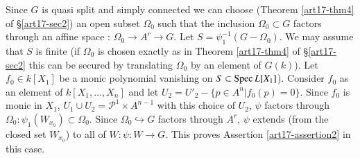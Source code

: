 \begin{romancase}%
Since $G$ is quasi split and simply connected we can choose (Theorem \ref{art17-thm4} of \S \ref{art17-sec2}) an open subset $\Omega_0$ such that the inclusion $\Omega_0 \subset G$ factors through an affine space : $\Omega_0 \to A^r \to G$. Let $S = \psi^{-1}_1 (G - \Omega_0)$. We may assume that $S$ is finite (if $\Omega_0$ is chosen exactly as in Theorem \ref{art17-thm4} of \S \ref{art17-sec2} this can be secured by translating $\Omega_0$ by an element of $G(k)$). Let $f_0 \in k [X_1]$ be a monic polynomial vanishing on $S \subset \operatorname{Spec} L[X_1]$). Consider   $f_0$ as an element of $k[X_1, \ldots, X_n]$ and let $U_2 = U'_2 - \{p \in A^n | f_0 (p) =0\}$. Since $f_0$ is monic in $X_1$, $U_1 \cup U_2 = \mathscr{P}^1 \times A^{n-1}$ with this choice of $U_2$, $\psi$ factors through $\Omega_0 : \psi_1 (W_{x_0}) \subset \Omega_0$. Since $\Omega_0 \hookrightarrow G$ factors through $A^r$, $\psi$ extends (from the closed set $W_{x_0}$) to all of $W: \psi: W \to G$. This proves Assertion \ref{art17-assertion2} in this case.
\end{romancase}

